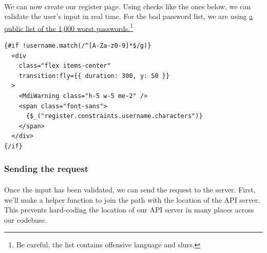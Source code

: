 \documentclass{report}
\begin{document}
\paragraph{}
We can now create our register page. Using checks like the ones below, we can validate the user's input in real time. For the bad password list, we are using \href{https://github.com/danielmiessler/SecLists/blob/master/Passwords/Common-Credentials/10-million-password-list-top-1000.txt}{a public list of the 1,000 worst passwords.}\footnote{Be careful, the list contains offensive language and slurs.}
\begin{verbatim}
{#if !username.match(/^[A-Za-z0-9]*$/g)}
  <div
    class="flex items-center"
    transition:fly={{ duration: 300, y: 50 }}
  >
    <MdiWarning class="h-5 w-5 me-2" />
    <span class="font-sans">
      {$_("register.constraints.username.characters")} 
    </span>
  </div>
{/if}
\end{verbatim}

\subsubsection{Sending the request}
\paragraph{}
Once the input has been validated, we can send the request to the server. First, we'll make a helper function to join the path with the location of the API server. This prevents hard-coding the location of our API server in many places across our codebase.
\end{document}
